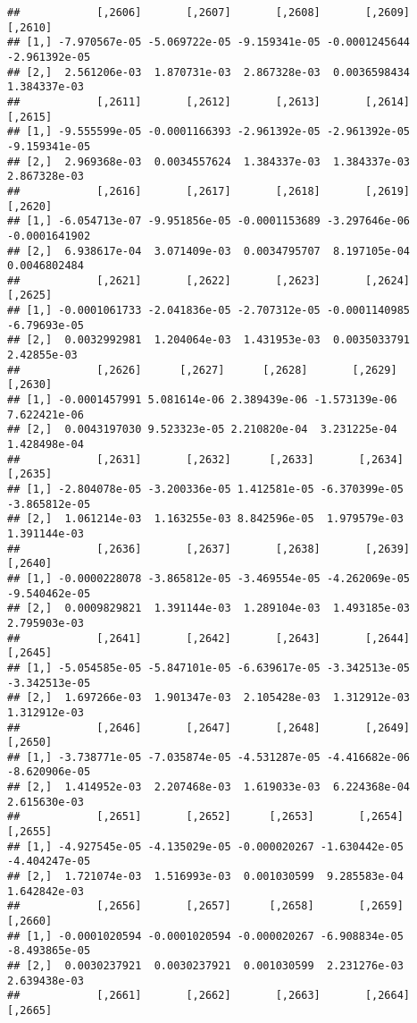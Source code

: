 \documentclass[
]{article}
\begin{document}
\begin{verbatim}
##            [,2606]       [,2607]       [,2608]       [,2609]       [,2610]
## [1,] -7.970567e-05 -5.069722e-05 -9.159341e-05 -0.0001245644 -2.961392e-05
## [2,]  2.561206e-03  1.870731e-03  2.867328e-03  0.0036598434  1.384337e-03
##            [,2611]       [,2612]       [,2613]       [,2614]       [,2615]
## [1,] -9.555599e-05 -0.0001166393 -2.961392e-05 -2.961392e-05 -9.159341e-05
## [2,]  2.969368e-03  0.0034557624  1.384337e-03  1.384337e-03  2.867328e-03
##            [,2616]       [,2617]       [,2618]       [,2619]       [,2620]
## [1,] -6.054713e-07 -9.951856e-05 -0.0001153689 -3.297646e-06 -0.0001641902
## [2,]  6.938617e-04  3.071409e-03  0.0034795707  8.197105e-04  0.0046802484
##            [,2621]       [,2622]       [,2623]       [,2624]      [,2625]
## [1,] -0.0001061733 -2.041836e-05 -2.707312e-05 -0.0001140985 -6.79693e-05
## [2,]  0.0032992981  1.204064e-03  1.431953e-03  0.0035033791  2.42855e-03
##            [,2626]      [,2627]      [,2628]       [,2629]      [,2630]
## [1,] -0.0001457991 5.081614e-06 2.389439e-06 -1.573139e-06 7.622421e-06
## [2,]  0.0043197030 9.523323e-05 2.210820e-04  3.231225e-04 1.428498e-04
##            [,2631]       [,2632]      [,2633]       [,2634]       [,2635]
## [1,] -2.804078e-05 -3.200336e-05 1.412581e-05 -6.370399e-05 -3.865812e-05
## [2,]  1.061214e-03  1.163255e-03 8.842596e-05  1.979579e-03  1.391144e-03
##            [,2636]       [,2637]       [,2638]       [,2639]       [,2640]
## [1,] -0.0000228078 -3.865812e-05 -3.469554e-05 -4.262069e-05 -9.540462e-05
## [2,]  0.0009829821  1.391144e-03  1.289104e-03  1.493185e-03  2.795903e-03
##            [,2641]       [,2642]       [,2643]       [,2644]       [,2645]
## [1,] -5.054585e-05 -5.847101e-05 -6.639617e-05 -3.342513e-05 -3.342513e-05
## [2,]  1.697266e-03  1.901347e-03  2.105428e-03  1.312912e-03  1.312912e-03
##            [,2646]       [,2647]       [,2648]       [,2649]       [,2650]
## [1,] -3.738771e-05 -7.035874e-05 -4.531287e-05 -4.416682e-06 -8.620906e-05
## [2,]  1.414952e-03  2.207468e-03  1.619033e-03  6.224368e-04  2.615630e-03
##            [,2651]       [,2652]      [,2653]       [,2654]       [,2655]
## [1,] -4.927545e-05 -4.135029e-05 -0.000020267 -1.630442e-05 -4.404247e-05
## [2,]  1.721074e-03  1.516993e-03  0.001030599  9.285583e-04  1.642842e-03
##            [,2656]       [,2657]      [,2658]       [,2659]       [,2660]
## [1,] -0.0001020594 -0.0001020594 -0.000020267 -6.908834e-05 -8.493865e-05
## [2,]  0.0030237921  0.0030237921  0.001030599  2.231276e-03  2.639438e-03
##            [,2661]       [,2662]       [,2663]       [,2664]       [,2665]

\end{verbatim}
\end{document}
